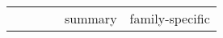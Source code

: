 \begin{table}[htb]
\begin{center}
\begin{tabular}{cccccc} 


\multicolumn{1}{c}{} & \multicolumn{1}{c}{} &
\multicolumn{1}{c}{} & \multicolumn{1}{c}{} &
\multicolumn{1}{c}{summary} & \multicolumn{1}{c}{family-specific} \\


\end{tabular}
\end{center}
\end{table}
